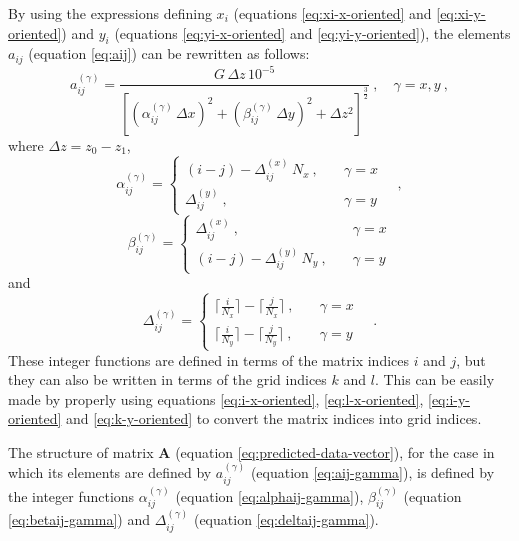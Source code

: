\documentclass[manuscript,revised]{geophysics}
\begin{document}
By using the expressions defining $x_{i}$ (equations \ref{eq:xi-x-oriented} and \ref{eq:xi-y-oriented}) and 
$y_{i}$ (equations \ref{eq:yi-x-oriented} and \ref{eq:yi-y-oriented}), 
the elements $a_{ij}$ (equation \ref{eq:aij}) can be rewritten as follows:
\begin{equation}
a_{ij}^{(\gamma)} = \frac{G \, \Delta z \, 10^{-5}}
{\left[ (\alpha_{ij}^{(\gamma)} \, \Delta x)^{2} + (\beta_{ij}^{(\gamma)} \, \Delta y)^{2} + \Delta z^{2} \right]^{\frac{3}{2}}} \: ,
\quad \gamma = x, y \: ,
\label{eq:aij-gamma}
\end{equation}
where $\Delta z = z_{0} - z_{1}$,
\begin{equation}
\alpha_{ij}^{(\gamma)} = \begin{cases}
(i - j) - \Delta_{ij}^{(x)} \, N_{x} \: , \quad & \gamma = x \\
\Delta_{ij}^{(y)} \: , \quad & \gamma = y
\end{cases} \quad ,
\label{eq:alphaij-gamma}
\end{equation}
\begin{equation}
\beta_{ij}^{(\gamma)} = \begin{cases}
\Delta_{ij}^{(x)} \: , \quad & \gamma = x \\
(i - j) - \Delta_{ij}^{(y)} \, N_{y} \: , \quad & \gamma = y
\end{cases}
\label{eq:betaij-gamma}
\end{equation}
and
\begin{equation}
\Delta_{ij}^{(\gamma)} = \begin{cases}
\Big\lceil \frac{i}{N_{x}} \Big\rceil - \Big\lceil \frac{j}{N_{x}} \Big\rceil \: , \quad & \gamma = x \\
\Big\lceil \frac{i}{N_{y}} \Big\rceil - \Big\lceil \frac{j}{N_{y}} \Big\rceil \: , \quad & \gamma = y
\end{cases} \quad .
\label{eq:deltaij-gamma}
\end{equation}
These integer functions are defined in terms of the matrix indices $i$ and $j$, but they can also be
written in terms of the grid indices $k$ and $l$. This can be easily made by properly using 
equations \ref{eq:i-x-oriented}, \ref{eq:l-x-oriented}, \ref{eq:i-y-oriented} and \ref{eq:k-y-oriented}
to convert the matrix indices into grid indices.

The structure of matrix $\mathbf{A}$ (equation \ref{eq:predicted-data-vector}), for the case in which
its elements are defined by $a_{ij}^{(\gamma)}$ (equation \ref{eq:aij-gamma}), is defined by 
the integer functions $\alpha_{ij}^{(\gamma)}$ (equation \ref{eq:alphaij-gamma}),
$\beta_{ij}^{(\gamma)}$ (equation \ref{eq:betaij-gamma}) and $\Delta_{ij}^{(\gamma)}$
(equation \ref{eq:deltaij-gamma}).
\end{document}
